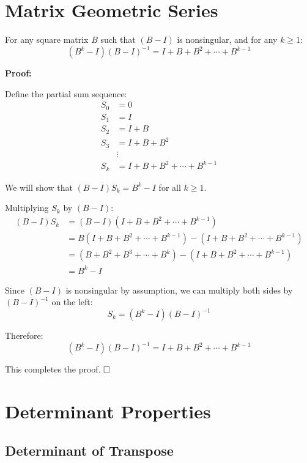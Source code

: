 \clearpage
\appendix

\section{Matrix Geometric Series}
\label{appendix:matrix-geometric-series}

\begin{tcolorbox}[colback=blue!5!white,colframe=blue!75!black,title=Lemma]
For any square matrix $B$ such that $(B - I)$ is nonsingular, and for any $k \geq 1$:
$$(B^k - I)(B - I)^{-1} = I + B + B^2 + \cdots + B^{k-1}$$
\end{tcolorbox}

\textbf{Proof:}

Define the partial sum sequence:
\begin{align*}
S_0 &= 0 \\
S_1 &= I \\
S_2 &= I + B \\
S_3 &= I + B + B^2 \\
&\vdots \\
S_k &= I + B + B^2 + \cdots + B^{k-1}
\end{align*}

We will show that $(B - I)S_k = B^k - I$ for all $k \geq 1$.

Multiplying $S_k$ by $(B - I)$:
\begin{align*}
(B - I)S_k &= (B - I)(I + B + B^2 + \cdots + B^{k-1}) \\
&= B(I + B + B^2 + \cdots + B^{k-1}) - (I + B + B^2 + \cdots + B^{k-1}) \\
&= (B + B^2 + B^3 + \cdots + B^k) - (I + B + B^2 + \cdots + B^{k-1}) \\
&= B^k - I
\end{align*}

Since $(B - I)$ is nonsingular by assumption, we can multiply both sides by $(B - I)^{-1}$ on the left:
$$S_k = (B^k - I)(B - I)^{-1}$$

Therefore:
$$(B^k - I)(B - I)^{-1} = I + B + B^2 + \cdots + B^{k-1}$$

This completes the proof. $\hfill \square$

\clearpage

\section{Determinant Properties}
\label{appendix:determinant-properties}

\subsection{Determinant of Transpose}
\label{appendix:det-transpose}

